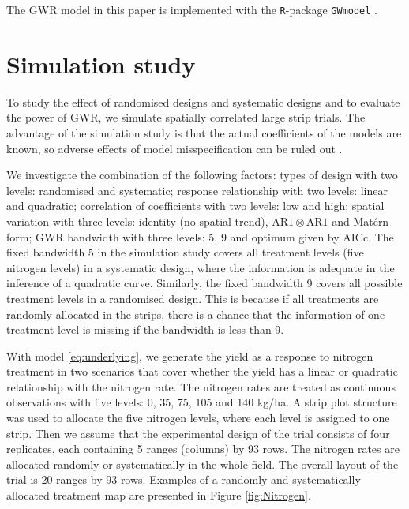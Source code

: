 \documentclass[a4paper]{article} 	%
\newcommand{\R}{\texttt{R}}
\newcommand{\Matern}{Mat\'ern }
\newcommand{\AR}{\mathrm{AR1}}
\begin{document}
The GWR model in this paper is implemented with the \R-package \texttt{GWmodel} \parencite{lu2014gwmodel, Gollini2015GWmodel}. 


\section{Simulation study}\label{Sec:Simu}

To study the effect of randomised designs and systematic designs and to evaluate the power of GWR, we simulate spatially correlated large strip trials. The advantage of the simulation study is that the actual coefficients of the models are known, so adverse effects of model misspecification
can be ruled out \parencite{Piepho2013Why}. 

We investigate the combination of the following factors: types of design with two levels: randomised and systematic; response relationship with two levels: linear and quadratic; correlation of coefficients with two levels: low and high; spatial variation with three levels: identity (no spatial trend), $\AR\otimes\AR$ and \Matern form; GWR bandwidth with three levels: 5, 9 and optimum given by AICc. The fixed bandwidth 5 in the simulation study covers all treatment levels (five nitrogen levels) in a systematic design, where the information is adequate in the inference of a quadratic curve. Similarly, the fixed bandwidth 9 covers all possible treatment levels in a randomised design. This is because if all treatments are randomly allocated in the strips, there is a chance that the information of one treatment level is missing if the bandwidth is less than 9. 

With model \eqref{eq:underlying}, we generate the yield as a response to nitrogen treatment in two scenarios that cover whether the yield has a linear or quadratic relationship with the nitrogen rate. The nitrogen rates are treated as continuous observations with five levels: 0, 35, 75, 105 and 140 kg/ha. A strip plot structure was used to allocate the five nitrogen levels, where each level is assigned to one strip. Then we assume that the experimental design of the trial consists of four replicates, each containing 5 ranges (columns) by 93 rows. The nitrogen rates are allocated randomly or systematically in the whole field. The overall layout of the trial is 20 ranges by 93 rows. Examples of a randomly and systematically allocated treatment map are presented in Figure \ref{fig:Nitrogen}. 
\end{document}
